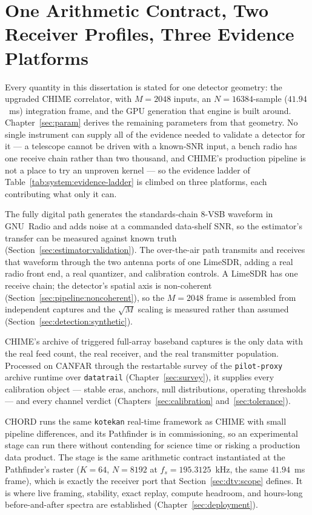 \section{One Arithmetic Contract, Two Receiver Profiles, Three Evidence Platforms}
\label{sec:system:platforms}

Every quantity in this dissertation is stated for one detector geometry: the upgraded CHIME correlator, with $M = 2048$ inputs, an $N = 16384$-sample ($41.94$~ms) integration frame, and the GPU generation that engine is built around. Chapter~\ref{sec:param} derives the remaining parameters from that geometry. No single instrument can supply all of the evidence needed to validate a detector for it --- a telescope cannot be driven with a known-SNR input, a bench radio has one receive chain rather than two thousand, and CHIME's production pipeline is not a place to try an unproven kernel --- so the evidence ladder of Table~\ref{tab:system:evidence-ladder} is climbed on three platforms, each contributing what only it can.

\begin{description}[leftmargin=1.6em]
\item[Synthetic: GNU~Radio and a LimeSDR.] The fully digital path generates the standards-chain 8-VSB waveform in GNU~Radio and adds noise at a commanded data-shelf SNR, so the estimator's transfer can be measured against known truth (Section~\ref{sec:estimator:validation}). The over-the-air path transmits and receives that waveform through the two antenna ports of one LimeSDR, adding a real radio front end, a real quantizer, and calibration controls. A LimeSDR has one receive chain; the detector's spatial axis is non-coherent (Section~\ref{sec:pipeline:noncoherent}), so the $M = 2048$ frame is assembled from independent captures and the $\sqrt{M}$ scaling is measured rather than assumed (Section~\ref{sec:detection:synthetic}).
\item[Offline: the CHIME baseband archive.] CHIME's archive of triggered full-array baseband captures is the only data with the real feed count, the real receiver, and the real transmitter population. Processed on CANFAR through the restartable survey of the \texttt{pilot-proxy} archive runtime over \texttt{datatrail} \cite{pilot-proxy-sw,datatrail-cli} (Chapter~\ref{sec:survey}), it supplies every calibration object --- stable eras, anchors, null distributions, operating thresholds --- and every channel verdict (Chapters~\ref{sec:calibration} and~\ref{sec:tolerance}).
\item[Online: the CHORD Pathfinder.] CHORD \cite{chord2019} runs the same \texttt{kotekan} real-time framework as CHIME with small pipeline differences, and its Pathfinder is in commissioning, so an experimental stage can run there without contending for science time or risking a production data product. The stage is the same arithmetic contract instantiated at the Pathfinder's raster ($K = 64$, $N = 8192$ at $f_s = 195.3125$~kHz, the same $41.94$~ms frame), which is exactly the receiver port that Section~\ref{sec:dtv:scope} defines. It is where live framing, stability, exact replay, compute headroom, and hours-long before-and-after spectra are established (Chapter~\ref{sec:deployment}).
\end{description}

